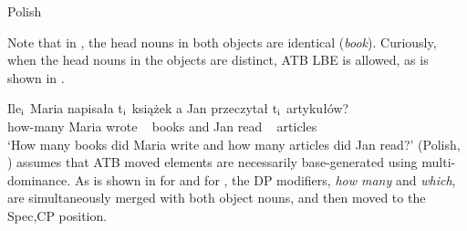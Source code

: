 \documentclass[output=paper]{langscibook}
\begin{document}
\ea Polish
	\label{shenatb1}
	\z 
\z 

Note that in , the head nouns in both objects are identical (\textit{book}). Curiously, when the head nouns in the objects are distinct, ATB LBE is allowed, as is shown in .

\ea
	\label{shenatb2}
	\gll Ile$_{\textnormal{i}}$ Maria napisała t$_{\textnormal{i}}$ książek a Jan przeczytał t$_{\textnormal{i}}$ artykułów? \\
	how-many Maria wrote {~} books and Jan read {~} articles\\
	\glt `How many books did Maria write and how many articles did Jan read?'  (Polish, \citealt[ex. 10a]{Citko:2006})
\z 
\citet{Citko:2006} assumes that ATB moved elements are necessarily base-generated using multi-dominance. As is shown in  for  and  for , the DP modifiers, \textit{how many} and \textit{which}, are simultaneously merged with both object nouns, and then moved to the Spec,CP position.  
\end{document}
